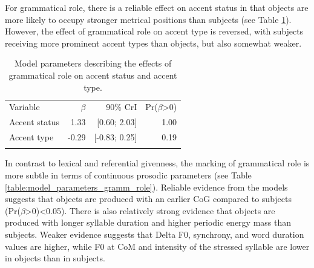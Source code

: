 For grammatical role, there is a reliable effect on accent status in that objects are more likely to occupy stronger metrical positions than subjects (see Table \ref{table:model_parameterscat_gramm_role}). However, the effect of grammatical role on accent type is reversed, with subjects receiving more prominent accent types than objects, but also somewhat weaker. 

\begin{table}[]
\begin{tabular}{lrrr}
\lsptoprule
\multicolumn{4}{c}{Grammatical role} \\ \hline
Variable    & $\beta$ & 90\% CrI  & Pr($\beta$\textgreater{}0) \\ \hline
Accent status    & 1.33       & {[}0.60; 2.03{]}  & 1.00                          \\
Accent type        & -0.29       & {[}-0.83; 0.25{]} & 0.19                          \\
\lspbottomrule
\end{tabular}
\caption{Model parameters describing the effects of grammatical role on accent status and accent type.}
\label{table:model_parameterscat_gramm_role}
\end{table}

In contrast to lexical and referential givenness, the marking of grammatical role is more subtle in terms of continuous prosodic parameters (see Table \ref{table:model_parameters_gramm_role}). Reliable evidence from the models suggests that objects are produced with an earlier CoG compared to subjects (Pr($\beta$\textgreater{}0)\textless{}0.05). There is also relatively strong evidence that objects are produced with longer syllable duration and higher periodic energy mass than subjects. Weaker evidence suggests that Delta F0, synchrony, and word duration values are higher, while F0 at CoM and intensity of the stressed syllable are lower in objects than in subjects.  

